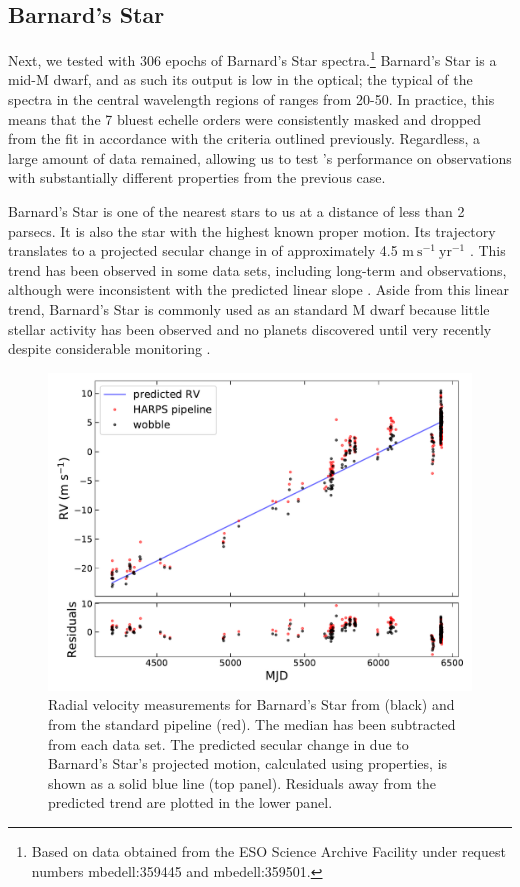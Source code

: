 \documentclass[modern]{aastex62}
\newcommand{\Mdwarf}{Barnard's Star\xspace} %
\begin{document}
{\subsection{\Mdwarf}
\label{s:Mdwarf}

Next, we tested \wobble with 306 epochs of \Mdwarf spectra.\footnote{Based on data obtained from the ESO Science Archive Facility under request numbers mbedell:359445 and mbedell:359501.} 
\Mdwarf is a mid-M dwarf, and as such its output is low in the optical; the typical \SNR of the spectra in the central wavelength regions of \HARPS ranges from 20-50. 
In practice, this means that the 7 bluest echelle orders were consistently masked and dropped from the fit in accordance with the \SNR criteria outlined previously. 
Regardless, a large amount of data remained, allowing us to test \wobble's performance on observations with substantially different properties from the previous case.

\Mdwarf is one of the nearest stars to us at a distance of less than 2 parsecs. 
It is also the star with the highest known proper motion. 
Its trajectory translates to a projected secular change in \RV of approximately 4.5 $\mathrm{m}~\mathrm{s}^{-1}~\mathrm{yr}^{-1}$ \citep{Kurster2003}. 
This trend has been observed in some data sets, including long-term \HARPS and  observations, although  \RVs were inconsistent with the predicted linear slope \citep{Kurster2003, Bonfils2013, Choi2013, Montet2014}. 
Aside from this linear trend, \Mdwarf is commonly used as an \RV standard M dwarf because little stellar activity has been observed and no planets discovered until very recently despite considerable \RV monitoring \citep{Ribas2018}. 

\begin{figure}
\centering
\includegraphics[width=5in]{barnards_rvs}
\caption{Radial velocity measurements for \Mdwarf from \wobble (black) and from the standard \HARPS pipeline (red). The median \RV has been subtracted from each data set. The predicted secular change in \RV due to \Mdwarf's projected motion, calculated using \gaia properties, is shown as a solid blue line (top panel). Residuals away from the predicted trend are plotted in the lower panel. }
\label{fig:barnards_rvs}
\end{figure}

}
\end{document}
